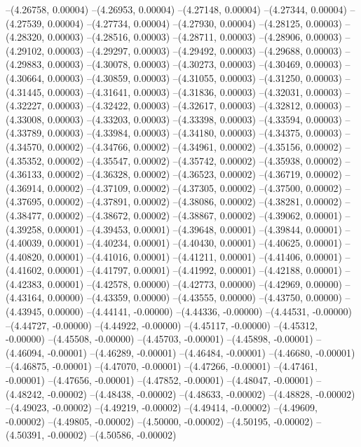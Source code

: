 --(4.26758, 0.00004)
--(4.26953, 0.00004)
--(4.27148, 0.00004)
--(4.27344, 0.00004)
--(4.27539, 0.00004)
--(4.27734, 0.00004)
--(4.27930, 0.00004)
--(4.28125, 0.00003)
--(4.28320, 0.00003)
--(4.28516, 0.00003)
--(4.28711, 0.00003)
--(4.28906, 0.00003)
--(4.29102, 0.00003)
--(4.29297, 0.00003)
--(4.29492, 0.00003)
--(4.29688, 0.00003)
--(4.29883, 0.00003)
--(4.30078, 0.00003)
--(4.30273, 0.00003)
--(4.30469, 0.00003)
--(4.30664, 0.00003)
--(4.30859, 0.00003)
--(4.31055, 0.00003)
--(4.31250, 0.00003)
--(4.31445, 0.00003)
--(4.31641, 0.00003)
--(4.31836, 0.00003)
--(4.32031, 0.00003)
--(4.32227, 0.00003)
--(4.32422, 0.00003)
--(4.32617, 0.00003)
--(4.32812, 0.00003)
--(4.33008, 0.00003)
--(4.33203, 0.00003)
--(4.33398, 0.00003)
--(4.33594, 0.00003)
--(4.33789, 0.00003)
--(4.33984, 0.00003)
--(4.34180, 0.00003)
--(4.34375, 0.00003)
--(4.34570, 0.00002)
--(4.34766, 0.00002)
--(4.34961, 0.00002)
--(4.35156, 0.00002)
--(4.35352, 0.00002)
--(4.35547, 0.00002)
--(4.35742, 0.00002)
--(4.35938, 0.00002)
--(4.36133, 0.00002)
--(4.36328, 0.00002)
--(4.36523, 0.00002)
--(4.36719, 0.00002)
--(4.36914, 0.00002)
--(4.37109, 0.00002)
--(4.37305, 0.00002)
--(4.37500, 0.00002)
--(4.37695, 0.00002)
--(4.37891, 0.00002)
--(4.38086, 0.00002)
--(4.38281, 0.00002)
--(4.38477, 0.00002)
--(4.38672, 0.00002)
--(4.38867, 0.00002)
--(4.39062, 0.00001)
--(4.39258, 0.00001)
--(4.39453, 0.00001)
--(4.39648, 0.00001)
--(4.39844, 0.00001)
--(4.40039, 0.00001)
--(4.40234, 0.00001)
--(4.40430, 0.00001)
--(4.40625, 0.00001)
--(4.40820, 0.00001)
--(4.41016, 0.00001)
--(4.41211, 0.00001)
--(4.41406, 0.00001)
--(4.41602, 0.00001)
--(4.41797, 0.00001)
--(4.41992, 0.00001)
--(4.42188, 0.00001)
--(4.42383, 0.00001)
--(4.42578, 0.00000)
--(4.42773, 0.00000)
--(4.42969, 0.00000)
--(4.43164, 0.00000)
--(4.43359, 0.00000)
--(4.43555, 0.00000)
--(4.43750, 0.00000)
--(4.43945, 0.00000)
--(4.44141, -0.00000)
--(4.44336, -0.00000)
--(4.44531, -0.00000)
--(4.44727, -0.00000)
--(4.44922, -0.00000)
--(4.45117, -0.00000)
--(4.45312, -0.00000)
--(4.45508, -0.00000)
--(4.45703, -0.00001)
--(4.45898, -0.00001)
--(4.46094, -0.00001)
--(4.46289, -0.00001)
--(4.46484, -0.00001)
--(4.46680, -0.00001)
--(4.46875, -0.00001)
--(4.47070, -0.00001)
--(4.47266, -0.00001)
--(4.47461, -0.00001)
--(4.47656, -0.00001)
--(4.47852, -0.00001)
--(4.48047, -0.00001)
--(4.48242, -0.00002)
--(4.48438, -0.00002)
--(4.48633, -0.00002)
--(4.48828, -0.00002)
--(4.49023, -0.00002)
--(4.49219, -0.00002)
--(4.49414, -0.00002)
--(4.49609, -0.00002)
--(4.49805, -0.00002)
--(4.50000, -0.00002)
--(4.50195, -0.00002)
--(4.50391, -0.00002)
--(4.50586, -0.00002)
